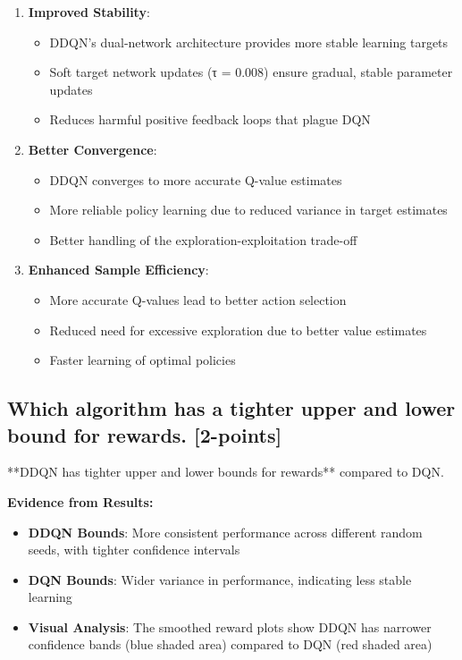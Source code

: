 \documentclass[12pt]{article}
\begin{document}
{{{\begin{enumerate}
    \item \textbf{Improved Stability}:
    \begin{itemize}
        \item DDQN's dual-network architecture provides more stable learning targets
        \item Soft target network updates (τ = 0.008) ensure gradual, stable parameter updates
        \item Reduces harmful positive feedback loops that plague DQN
    \end{itemize}
    
    \item \textbf{Better Convergence}:
    \begin{itemize}
        \item DDQN converges to more accurate Q-value estimates
        \item More reliable policy learning due to reduced variance in target estimates
        \item Better handling of the exploration-exploitation trade-off
    \end{itemize}
    
    \item \textbf{Enhanced Sample Efficiency}:
    \begin{itemize}
        \item More accurate Q-values lead to better action selection
        \item Reduced need for excessive exploration due to better value estimates
        \item Faster learning of optimal policies
    \end{itemize}
\end{enumerate}

\subsection{Which algorithm has a tighter upper and lower bound for rewards. [2-points]}

**DDQN has tighter upper and lower bounds for rewards** compared to DQN.

\textbf{Evidence from Results:}
\begin{itemize}
    \item \textbf{DDQN Bounds}: More consistent performance across different random seeds, with tighter confidence intervals
    \item \textbf{DQN Bounds}: Wider variance in performance, indicating less stable learning
    \item \textbf{Visual Analysis}: The smoothed reward plots show DDQN has narrower confidence bands (blue shaded area) compared to DQN (red shaded area)
\end{itemize}

}}}
\end{document}
